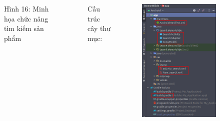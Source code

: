 \documentclass{beamer}
\begin{document}
\begin{frame}
\begin{columns}
\begin{figure}
            \caption{\centering\tiny{Hình 16: Minh họa chức năng tìm kiếm sản phẩm}}
        \end{figure}
        \indent Cấu trúc cây thư mục:
        \begin{figure}
            \centering
            \includegraphics[height=0.68\textheight]{images/41.png}
        \end{figure}
    \end{columns}
\end{frame}
\end{document}
